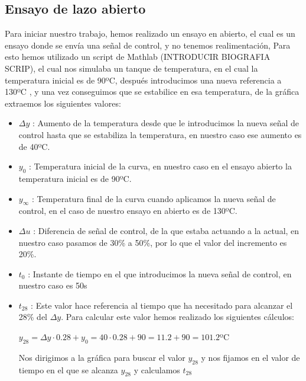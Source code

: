 \documentclass[11pt]{article}
\begin{document}
\subsection{Ensayo de lazo abierto}
Para iniciar nuestro trabajo, hemos realizado un ensayo en abierto, el cual es un ensayo donde se envía una señal de control, y no tenemos realimentación, 
Para esto hemos utilizado un script de Mathlab (INTRODUCIR BIOGRAFIA SCRIP), el cual nos simulaba un tanque de temperatura, en el cual la temperatura inicial es de 90ºC, después introducimos una nueva referencia a 130ºC , y una vez conseguimos que se estabilice en esa temperatura, de la gráfica extraemos los siguientes valores:
\begin{itemize}
    \item $\Delta y$ : Aumento de la temperatura desde que le introducimos la nueva señal de control hasta que se estabiliza la temperatura, en nuestro caso ese aumento es de 40ºC.

    \item $y_{0}$ : Temperatura inicial de la curva, en nuestro caso en el ensayo abierto la temperatura inicial es de 90ºC.

    \item $y_{\infty}$ : Temperatura final de la curva cuando aplicamos la nueva señal de control, en el caso de nuestro ensayo en abierto es de 130ºC.

    \item $\Delta u$ : Diferencia de señal de control, de la que estaba actuando a la actual, en nuestro caso pasamos de 30\% a 50\%, por lo que el valor del incremento es 20\%.

    \item $t_{0}$ : Instante de tiempo en el que introducimos la nueva señal de control, en nuestro caso es 50s
    
    \item $t_{28}$ : Este valor hace referencia al tiempo que ha necesitado para alcanzar el 28\% del $\Delta y$.
    Para calcular este valor hemos realizado los siguientes cálculos:\\

    \begin{center}
        $y_{28} = \Delta y \cdot  0.28 + y_{0} = 40 \cdot 0.28 + 90 = 11.2 + 90 = 101.2$ºC
    \end{center}
     

    Nos dirigimos a la gráfica para buscar el valor $y_{28}$ y nos fijamos en el valor de tiempo en el que se alcanza $y_{28}$ y calculamos $t_{28}$


\end{itemize}
\end{document}
